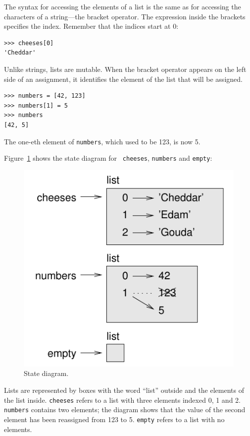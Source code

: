 \documentclass[10pt]{book}
\begin{document}
The syntax for accessing the elements of a list is the same as for
accessing the characters of a string---the bracket operator.  The
expression inside the brackets specifies the index.  Remember that the
indices start at 0:

\begin{verbatim}
>>> cheeses[0]
'Cheddar'
\end{verbatim}
%
Unlike strings, lists are mutable.  When the bracket operator appears
on the left side of an assignment, it identifies the element of the
list that will be assigned.

\begin{verbatim}
>>> numbers = [42, 123]
>>> numbers[1] = 5
>>> numbers
[42, 5]
\end{verbatim}
%
The one-eth element of {\tt numbers}, which
used to be 123, is now 5.

Figure~\ref{fig.liststate} shows 
the state diagram for {\tt
cheeses}, {\tt numbers} and {\tt empty}:

\begin{figure}
\centerline
{\includegraphics[scale=0.8]{figs/liststate.pdf}}
\caption{State diagram.}
\label{fig.liststate}
\end{figure}

Lists are represented by boxes with the word ``list'' outside
and the elements of the list inside.  {\tt cheeses} refers to
a list with three elements indexed 0, 1 and 2.
{\tt numbers} contains two elements; the diagram shows that the
value of the second element has been reassigned from 123 to 5.
{\tt empty} refers to a list with no elements.
\end{document}
